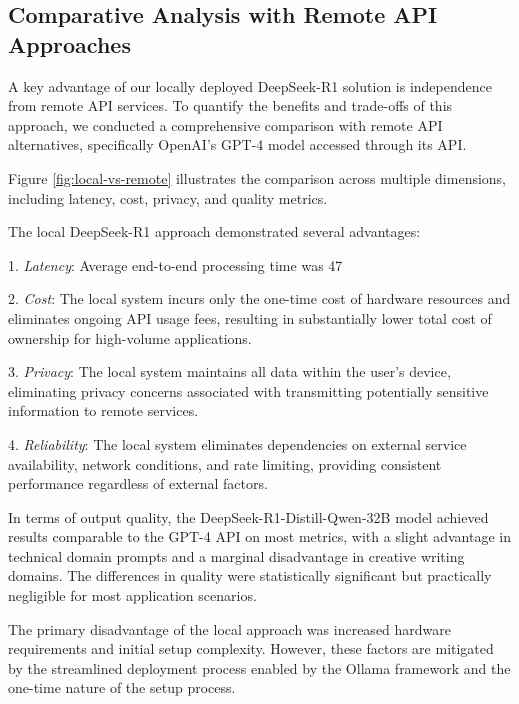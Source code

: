 \subsection{Comparative Analysis with Remote API Approaches}
\label{subsec:comparative-analysis}

A key advantage of our locally deployed DeepSeek-R1 solution is independence from remote API services. To quantify the benefits and trade-offs of this approach, we conducted a comprehensive comparison with remote API alternatives, specifically OpenAI's GPT-4 model accessed through its API.

Figure \ref{fig:local-vs-remote} illustrates the comparison across multiple dimensions, including latency, cost, privacy, and quality metrics.


The local DeepSeek-R1 approach demonstrated several advantages:

1. \textit{Latency}: Average end-to-end processing time was 47%

2. \textit{Cost}: The local system incurs only the one-time cost of hardware resources and eliminates ongoing API usage fees, resulting in substantially lower total cost of ownership for high-volume applications.

3. \textit{Privacy}: The local system maintains all data within the user's device, eliminating privacy concerns associated with transmitting potentially sensitive information to remote services.

4. \textit{Reliability}: The local system eliminates dependencies on external service availability, network conditions, and rate limiting, providing consistent performance regardless of external factors.

In terms of output quality, the DeepSeek-R1-Distill-Qwen-32B model achieved results comparable to the GPT-4 API on most metrics, with a slight advantage in technical domain prompts and a marginal disadvantage in creative writing domains. The differences in quality were statistically significant but practically negligible for most application scenarios.

The primary disadvantage of the local approach was increased hardware requirements and initial setup complexity. However, these factors are mitigated by the streamlined deployment process enabled by the Ollama framework and the one-time nature of the setup process.

